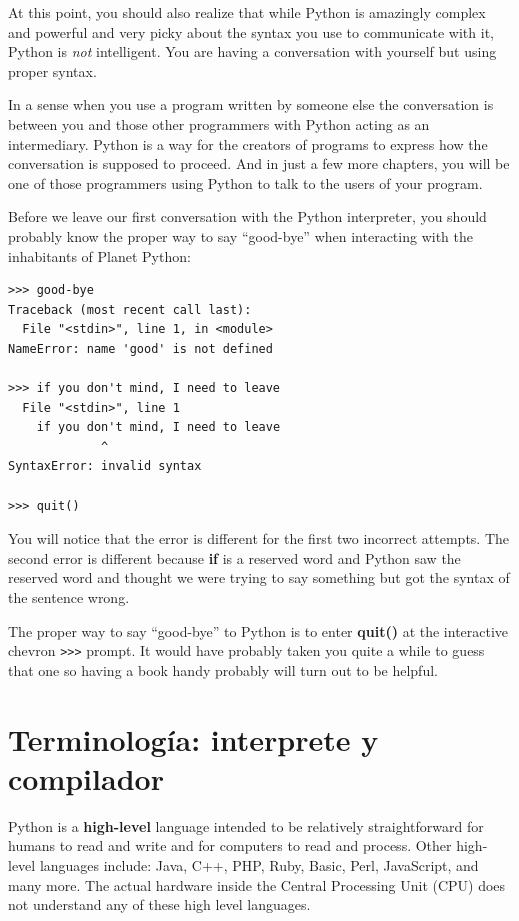 At this point, you should also realize that while Python 
is amazingly complex and powerful and very picky about 
the syntax you use to communicate with it, Python is {\em 
not} intelligent.  You are having a conversation with 
yourself but using proper syntax.

In a sense when you use a program written by someone else
the conversation is between you and those other
programmers with Python acting as an intermediary.  Python
is a way for the creators of programs to express how the 
conversation is supposed to proceed.  And
in just a few more chapters, you will be one of those
programmers using Python to talk to the users of your program.

Before we leave our first conversation with the Python 
interpreter, you should probably know the proper way
to say ``good-bye'' when interacting with the inhabitants
of Planet Python:

\beforeverb
\begin{verbatim}
>>> good-bye
Traceback (most recent call last):
  File "<stdin>", line 1, in <module>
NameError: name 'good' is not defined

>>> if you don't mind, I need to leave
  File "<stdin>", line 1
    if you don't mind, I need to leave
             ^
SyntaxError: invalid syntax

>>> quit()
\end{verbatim}
\afterverb
%
You will notice that the error is different for the first two
incorrect attempts.   The second error is different because 
{\bf if} is a reserved word and Python saw the reserved word
and thought we were trying to say something but got the syntax
of the sentence wrong.

The proper way to say ``good-bye'' to Python is to enter 
{\bf quit()} at the interactive chevron {\tt >>>} prompt.
It would have probably taken you quite a while to guess that 
one so having a book handy probably will turn out 
to be helpful.

\section{Terminolog\'ia: interprete y compilador}

Python is a {\bf high-level} language intended to be relatively
straightforward for humans to read and write and for computers
to read and process.  Other high-level languages include: Java, C++,
PHP, Ruby, Basic, Perl, JavaScript, and many more.  The actual hardware
inside the Central Processing Unit (CPU) does not understand any
of these high level languages.

